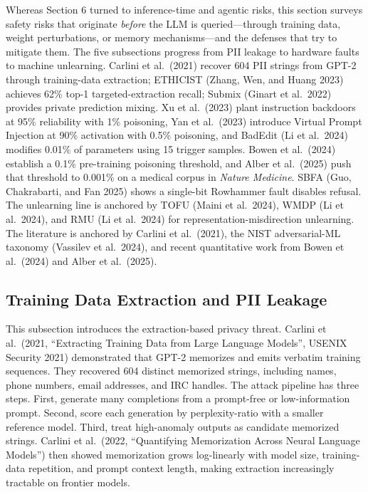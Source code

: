Whereas Section 6 turned to inference-time and agentic risks, this section surveys safety risks that originate \emph{before} the LLM is queried---through training data, weight perturbations, or memory mechanisms---and the defenses that try to mitigate them. The five subsections progress from PII leakage to hardware faults to machine unlearning. Carlini et al.~(2021) recover 604 PII strings from GPT-2 through training-data extraction; ETHICIST (Zhang, Wen, and Huang 2023) achieves 62\% top-1 targeted-extraction recall; Submix (Ginart et al.~2022) provides private prediction mixing. Xu et al.~(2023) plant instruction backdoors at 95\% reliability with 1\% poisoning, Yan et al.~(2023) introduce Virtual Prompt Injection at 90\% activation with 0.5\% poisoning, and BadEdit (Li et al.~2024) modifies 0.01\% of parameters using 15 trigger samples. Bowen et al.~(2024) establish a 0.1\% pre-training poisoning threshold, and Alber et al.~(2025) push that threshold to 0.001\% on a medical corpus in \emph{Nature Medicine}. SBFA (Guo, Chakrabarti, and Fan 2025) shows a single-bit Rowhammer fault disables refusal. The unlearning line is anchored by TOFU (Maini et al.~2024), WMDP (Li et al.~2024), and RMU (Li et al.~2024) for representation-misdirection unlearning. The literature is anchored by Carlini et al.~(2021), the NIST adversarial-ML taxonomy (Vassilev et al.~2024), and recent quantitative work from Bowen et al.~(2024) and Alber et al.~(2025).

\subsection{Training Data Extraction and PII Leakage}\label{training-data-extraction-and-pii-leakage}

This subsection introduces the extraction-based privacy threat. Carlini et al.~(2021, ``Extracting Training Data from Large Language Models'', USENIX Security 2021) demonstrated that GPT-2 memorizes and emits verbatim training sequences. They recovered 604 distinct memorized strings, including names, phone numbers, email addresses, and IRC handles. The attack pipeline has three steps. First, generate many completions from a prompt-free or low-information prompt. Second, score each generation by perplexity-ratio with a smaller reference model. Third, treat high-anomaly outputs as candidate memorized strings. Carlini et al.~(2022, ``Quantifying Memorization Across Neural Language Models'') then showed memorization grows log-linearly with model size, training-data repetition, and prompt context length, making extraction increasingly tractable on frontier models.

